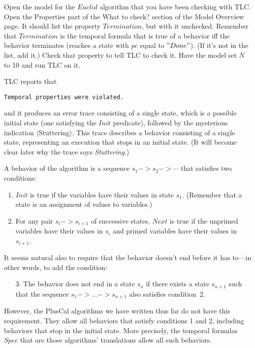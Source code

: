 Open the model for the $Euclid$ algorithm that you have been checking
with TLC. Open the \textsf{Properties} part of the \textsf{What to
check?} section of the \textsf{Model Overview} page.  It should list
the property $Termination$, but with it unchecked.  Remember that
$Termination$ is the temporal formula that is true of a behavior iff
the behavior terminates (reaches a state with $pc$ equal to $"Done"$).
(If it's not in the list, add it.)  Check that property to tell TLC to
check it.  Have the model set $N$ to 10 and run TLC on it.

TLC reports that
\begin{display}
\tt Temporal properties were violated.
\end{display}
and it produces an error trace consisting of a single state, which is a
possible initial state (one satisfying the $Init$ predicate), followed
by the mysterious indication $\langle$\textsf{Stuttering}$\rangle$.
This trace describes a behavior consisting of a single state,
representing an execution that stops in an initial state.  (It will
become clear later why the trace says \emph{Stuttering}.)

A behavior of the algorithm is a sequence $s_{1}-> s_{2}-> \cdots$
that satisfies two conditions:
\begin{enumerate}
\item $Init$ is true if the variables have their values in state $s_{1}$.
(Remember that a state is an assignment of values to variables.)

\item For any pair $s_{i}->s_{i+1}$ of successive states, $Next$ is
true if the unprimed variables have their values in $s_{i}$ and
primed variables have their values in $s_{i+1}$.  
\end{enumerate}
It seems natural also to require that the behavior doesn't end before
it has to---in other words, to add the condition:
\begin{enumerate}
\item[3.] The behavior does not end in a state $s_{n}$ if there exists
a state $s_{n+1}$ such that the sequence $s_{1}->\ldots->s_{n+1}$ also
satisfies condition~2.
\end{enumerate}
However, the PlusCal algorithms we have written thus far do not have
this requirement.  They allow all behaviors that satisfy conditions 1
and 2, including behaviors that stop in the initial state.  More
precisely, the temporal formulas $Spec$ that are those algorithms'
translations allow all such behaviors.

